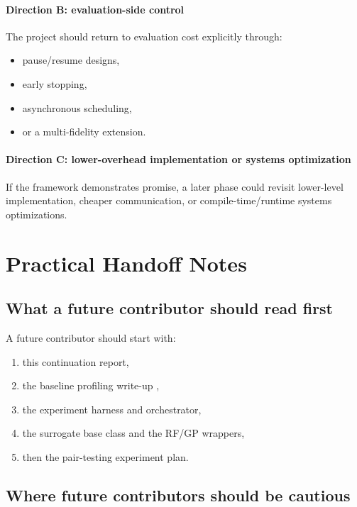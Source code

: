 \documentclass[11pt]{article}
\begin{document}
\paragraph{Direction B: evaluation-side control}
The project should return to evaluation cost explicitly through:
\begin{itemize}[leftmargin=1.5em]
    \item pause/resume designs,
    \item early stopping,
    \item asynchronous scheduling,
    \item or a multi-fidelity extension.
\end{itemize}

\paragraph{Direction C: lower-overhead implementation or systems optimization}
If the framework demonstrates promise, a later phase could revisit lower-level implementation, cheaper communication, or compile-time/runtime systems optimizations.

\section{Practical Handoff Notes}

\subsection{What a future contributor should read first}

A future contributor should start with:
\begin{enumerate}[leftmargin=1.5em]
    \item this continuation report,
    \item the baseline profiling write-up \cite{oumer2026baseline},
    \item the experiment harness and orchestrator,
    \item the surrogate base class and the RF/GP wrappers,
    \item then the pair-testing experiment plan.
\end{enumerate}


\subsection{Where future contributors should be cautious}
\end{document}
